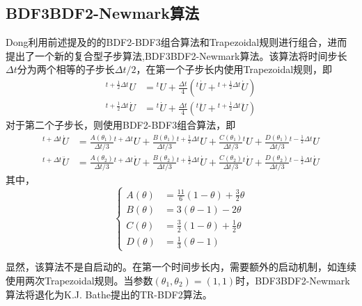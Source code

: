 \subsection{BDF3BDF2-Newmark算法}
Dong利用前述提及的的BDF2-BDF3组合算法和Trapezoidal规则进行组合，进而提出了一个新的复合型子步算法,BDF3BDF2-Newmark算法\cite{Dong2013}。该算法将时间步长$\Delta t$分为两个相等的子步长$\Delta t/2$，在第一个子步长内使用Trapezoidal规则，即
\begin{align}
{^{t+\frac{1}{2}\Delta t}\!U}&={^t\!U}+\frac{\Delta t}{4}({^{t}\!\dot{U}}+{^{t+\frac12\Delta t}\!\dot{U}})\\
{^{t+\frac{1}{2}\Delta t}\!\dot{U}}&={^t\!\dot{U}}+\frac{\Delta t}{4}({^{t}\!\ddot{U}}+{^{t+\frac12\Delta t}\!\ddot{U}})
\end{align}
对于第二个子步长，则使用BDF2-BDF3组合算法，即
\begin{align}
{^{t+\Delta t}\!\dot{U}}&=\frac{A(\theta_1)}{\Delta t/3}{^{t+\Delta t}\!{U}}+\frac{B(\theta_1)}{\Delta t/3}{^{t+\frac12\Delta t}\!{U}}+\frac{C(\theta_1)}{\Delta t/3}{^{t}\!{U}}+\frac{D(\theta_1)}{\Delta t/3}{^{t-\frac12\Delta t}\!{U}}\\
{^{t+\Delta t}\!\ddot{U}}&=\frac{A(\theta_2)}{\Delta t/3}{^{t+\Delta t}\!\dot{U}}+\frac{B(\theta_2)}{\Delta t/3}{^{t+\frac12\Delta t}\!\dot{U}}+\frac{C(\theta_2)}{\Delta t/3}{^{t}\!\dot{U}}+\frac{D(\theta_2)}{\Delta t/3}{^{t-\frac12\Delta t}\!\dot{U}}
\end{align}
其中，
\begin{equation}
\left\{\begin{aligned}
A(\theta)&=\frac{11}{6}(1-\theta)+\frac32\theta\\
B(\theta)&=3(\theta-1)-2\theta\\
C(\theta)&=\frac{3}{2}(1-\theta)+\frac{1}{2}\theta\\
D(\theta)&=\frac{1}{3}(\theta-1)
\end{aligned}\right.
\end{equation}

显然，该算法不是自启动的。在第一个时间步长内，需要额外的启动机制，如连续使用两次Trapezoidal规则。当参数$(\theta_1,\theta_2)=(1,1)$时，BDF3BDF2-Newmark算法将退化为K.J. Bathe提出的TR-BDF2算法。

